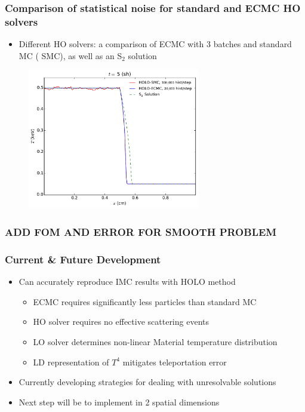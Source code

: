 \documentclass[xcolor=dvipsnames,hyperref={pdfpagelabels=false},unknownkeysallowed]{beamer}
\newcommand{\colb}[1]{{\color{blue} #1}}
\newcommand{\colr}[1]{{\color{red} #1}}
\newlength{\wideitemsep}
\let\olditem\item
\renewcommand{\item}{\setlength{\itemsep}{\wideitemsep}\olditem}
\begin{document}
{\begin{frame}
    \frametitle{Comparison of statistical noise for standard and ECMC HO solvers}
    \begin{block}{}
        {\small
    \begin{itemize}
        \item Different HO solvers: a
            comparison of
            \colb{ECMC} with 3 batches and standard MC (\colr{SMC}), as well as an S$_2$
            solution
    \end{itemize}
}
    \end{block}
    \centering
    \begin{figure}
    \includegraphics[width=0.6699\textwidth]{two_mat_ho_compare.pdf}
    \centering
    \end{figure}
\end{frame}

\begin{frame}
    \frametitle{ADD FOM AND ERROR FOR SMOOTH PROBLEM}

\end{frame}


}

\begin{frame}
    \frametitle{Current \& Future Development}
    \begin{itemize}
        \item Can accurately reproduce IMC results with HOLO method
        \begin{itemize}
            \item ECMC requires \colb{significantly less particles} than standard MC
            \item HO solver requires no effective scattering events
            \item LO solver determines non-linear Material temperature distribution
            \item LD representation of $T^4$ mitigates teleportation error
        \end{itemize}
        
    \item Currently developing strategies for dealing with unresolvable solutions
    \item Next step will be to implement in 2 spatial dimensions
    \end{itemize}
\end{frame}
\end{document}
